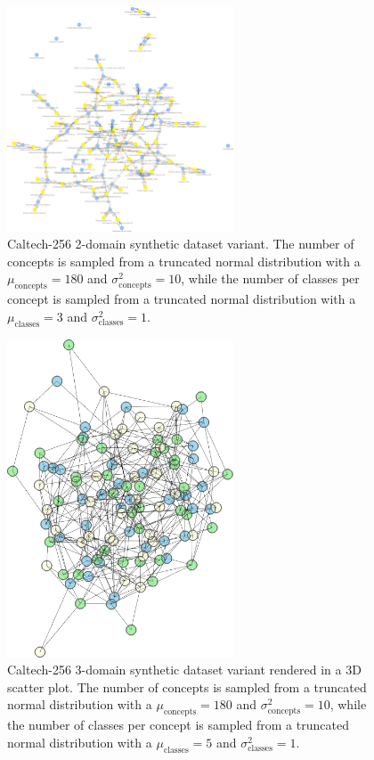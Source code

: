 \begin{figure}[ht]
      \centering
      \includegraphics[width=0.6\textwidth]{figures/caltech256_2domain.png}
      \caption{Caltech-256 2-domain synthetic dataset variant.
      The number of concepts is sampled from a truncated normal distribution
      with a $\mu_{\text{concepts}}=180$ and $\sigma^2_{\text{concepts}}=10$,
      while the number of classes per concept is sampled from a truncated normal distribution
      with a $\mu_{\text{classes}}=3$ and $\sigma^2_{\text{classes}}=1$.}
      \label{fig:caltech256_2domain}
\end{figure}

\begin{figure}[ht]
      \centering
      \includegraphics[width=0.6\textwidth]{figures/caltech256_3domain.png}
      \caption{Caltech-256 3-domain synthetic dataset variant rendered in a 3D scatter plot.
      The number of concepts is sampled from a truncated normal distribution
      with a $\mu_{\text{concepts}}=180$ and $\sigma^2_{\text{concepts}}=10$,
      while the number of classes per concept is sampled from a truncated normal distribution
      with a $\mu_{\text{classes}}=5$ and $\sigma^2_{\text{classes}}=1$.}
      \label{fig:caltech256_3domain}
\end{figure}

